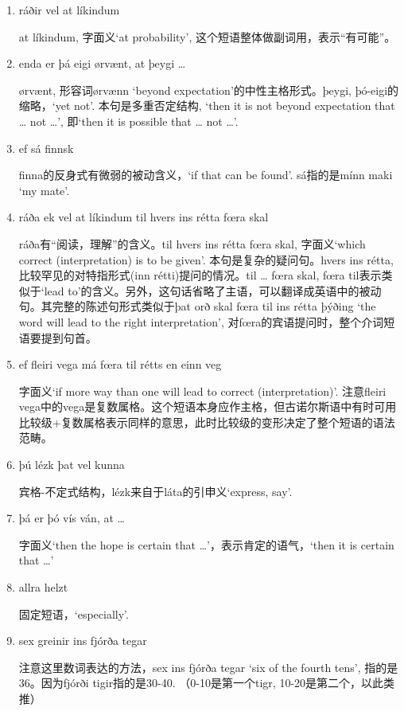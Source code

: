 \begin{grammar*}{}
    \begin{enumerate}[leftmargin=*]
        \item ráðir vel at líkindum

              at líkindum, 字面义`at probability', 这个短语整体做副词用，表示“有可能”。

        \item enda er þá eigi ørvænt, at þeygi {\dots}

              ørvænt, 形容词ørvænn `beyond expectation'的中性主格形式。þeygi, þó-eigi的缩略，`yet not'. 本句是多重否定结构, `then it is not beyond expectation that {\dots} not {\dots}', 即`then it is possible that {\dots} not {\dots}'.

        \item ef sá finnsk

              finna的反身式有微弱的被动含义，`if that can be found'. sá指的是mínn maki `my mate'.

        \item ráða ek vel at líkindum til hvers ins rétta fœra skal

              ráða有“阅读，理解”的含义。til hvers ins rétta fœra skal, 字面义`which correct (interpretation) is to be given'. 本句是复杂的疑问句。hvers ins rétta, 比较罕见的对特指形式(inn rétti)提问的情况。til {\dots} fœra skal, fœra til表示类似于`lead to'的含义。另外，这句话省略了主语，可以翻译成英语中的被动句。其完整的陈述句形式类似于þat orð skal fœra til ins rétta þýðing `the word will lead to the right interpretation', 对fœra的宾语提问时，整个介词短语要提到句首。

        \item ef fleiri vega má fœra til rétts en einn veg

              字面义`if more way than one will lead to correct (interpretation)'. 注意fleiri vega中的vega是复数属格。这个短语本身应作主格，但古诺尔斯语中有时可用比较级+复数属格表示同样的意思，此时比较级的变形决定了整个短语的语法范畴。

        \item þú lézk þat vel kunna

              宾格-不定式结构，lézk来自于láta的引申义`express, say'.

        \item þá er þó vís ván, at {\dots}

              字面义`then the hope is certain that {\dots}'，表示肯定的语气，`then it is certain that {\dots}'

        \item allra helzt

              固定短语，`especially'.

        \item sex greinir ins fjórða tegar

              注意这里数词表达的方法，sex ins fjórða tegar `six of the fourth tens', 指的是36。因为fjórði tigir指的是30-40. （0-10是第一个tigr, 10-20是第二个，以此类推）
    \end{enumerate}
\end{grammar*}
